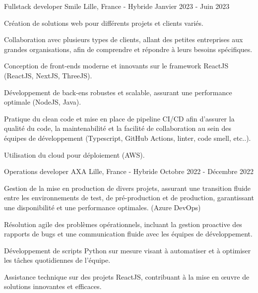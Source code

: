 \begin{cventries}
  \cventry
    {Fullstack developer} %
    {Smile} %
    {Lille, France - Hybride} %
    {Janvier 2023 - Juin 2023} %
    {
      \begin{cvitems} %
        \item {Création de solutions web pour différents projets et clients variés.}
        \item {Collaboration avec plusieurs types de clients, allant des petites entreprises aux grandes organisations, afin de comprendre et répondre à leurs besoins spécifiques.}
        \item {Conception de front-ends moderne et innovants sur le framework ReactJS (ReactJS, NextJS, ThreeJS).}
        \item {Développement de back-ens robustes et scalable, assurant une performance optimale (NodeJS, Java).}
        \item {Pratique du clean code et mise en place de pipeline CI/CD afin d'assurer la qualité du code, la maintenabilité et la facilité de collaboration au sein des équipes de développement (Typescript, GitHub Actions, linter, code smell, etc..).}
        \item {Utilisation du cloud pour déploiement (AWS).}
      \end{cvitems}
    }

  \cventry
    {Operations developer} %
    {AXA} %
    {Lille, France - Hybride} %
    {Octobre 2022 - Décembre 2022} %
    {
      \begin{cvitems} %
        \item {Gestion de la mise en production de divers projets, assurant une transition fluide entre les environnements de test, de pré-production et de production, garantissant une disponibilité et une performance optimales. (Azure DevOps)}
        \item {Résolution agile des problèmes opérationnels, incluant la gestion proactive des rapports de bugs et une communication fluide avec les équipes de développement.}
        \item {Développement de scripts Python sur mesure visant à automatiser et à optimiser les tâches quotidiennes de l'équipe.}
        \item {Assistance technique sur des projets ReactJS, contribuant à la mise en œuvre de solutions innovantes et efficaces.}
      \end{cvitems}
    }


\end{cventries}
